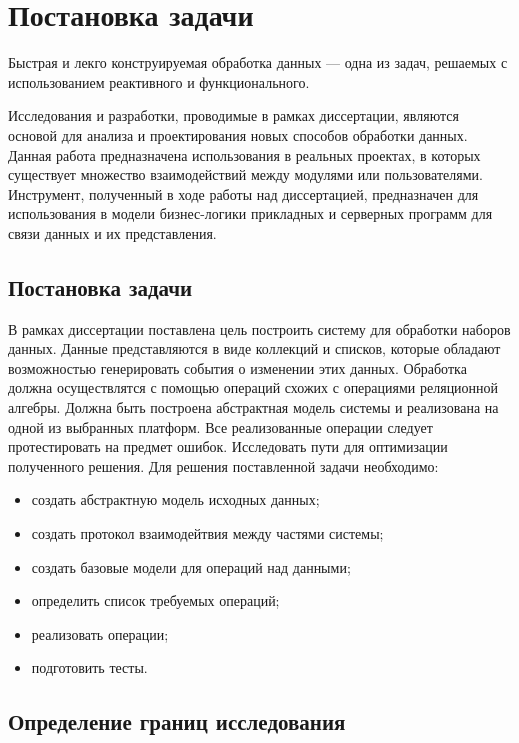 \chapter{Постановка задачи}
\label{sec:practice:planning}

Быстрая и лекго конструируемая обработка данных --- одна из задач, решаемых с использованием реактивного и функционального.

Исследования и разработки, проводимые в рамках диссертации, являются основой для анализа и проектирования новых способов обработки данных.
Данная работа предназначена использования в реальных проектах, в которых существует множество взаимодействий между модулями или пользователями.
Инструмент, полученный в ходе работы над диссертацией, предназначен для использования в модели бизнес-логики прикладных
и серверных программ для связи данных и их представления.

\section{Постановка задачи}
\label{sub:practice:task_planning}

В рамках диссертации поставлена цель построить систему для обработки наборов данных.
Данные представляются в виде коллекций и списков, которые обладают возможностью генерировать события о изменении этих данных.
Обработка должна осуществлятся с помощью операций схожих с операциями реляционной алгебры.
Должна быть построена абстрактная модель системы и реализована на одной из выбранных платформ.
Все реализованные операции следует протестировать на предмет ошибок.
Исследовать пути для оптимизации полученного решения.
Для решения поставленной задачи необходимо:
\begin{itemize}
  \item создать абстрактную модель исходных данных;
  \item создать протокол взаимодейтвия между частями системы;
  \item создать базовые модели для операций над данными;
  \item	определить список требуемых операций;
  \item	реализовать операции;
  \item	подготовить тесты.
\end{itemize}

\section{Определение границ исследования}
\label{sub:practice:task_milestone}

